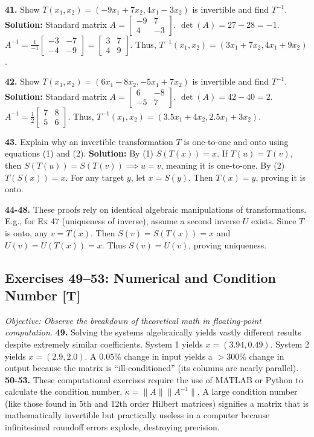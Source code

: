 \documentclass[11pt]{article}
\begin{document}
\textbf{41.} Show $T(x_1, x_2) = (-9x_1 + 7x_2, 4x_1 - 3x_2)$ is invertible and find $T^{-1}$.
\textbf{Solution:} Standard matrix $A = \begin{bmatrix} -9 & 7 \\ 4 & -3 \end{bmatrix}$. 
$\det(A) = 27 - 28 = -1$.
$A^{-1} = \frac{1}{-1} \begin{bmatrix} -3 & -7 \\ -4 & -9 \end{bmatrix} = \begin{bmatrix} 3 & 7 \\ 4 & 9 \end{bmatrix}$. 
Thus, $T^{-1}(x_1, x_2) = (3x_1 + 7x_2, 4x_1 + 9x_2)$.

\textbf{42.} Show $T(x_1, x_2) = (6x_1 - 8x_2, -5x_1 + 7x_2)$ is invertible and find $T^{-1}$.
\textbf{Solution:} Standard matrix $A = \begin{bmatrix} 6 & -8 \\ -5 & 7 \end{bmatrix}$. 
$\det(A) = 42 - 40 = 2$.
$A^{-1} = \frac{1}{2} \begin{bmatrix} 7 & 8 \\ 5 & 6 \end{bmatrix}$. 
Thus, $T^{-1}(x_1, x_2) = (3.5x_1 + 4x_2, 2.5x_1 + 3x_2)$.

\textbf{43.} Explain why an invertible transformation $T$ is one-to-one and onto using equations (1) and (2).
\textbf{Solution:} By (1) $S(T(x)) = x$. If $T(u) = T(v)$, then $S(T(u)) = S(T(v)) \implies u = v$, meaning it is one-to-one. By (2) $T(S(x)) = x$. For any target $y$, let $x = S(y)$. Then $T(x) = y$, proving it is onto.

\textbf{44-48.} These proofs rely on identical algebraic manipulations of transformations. E.g., for Ex 47 (uniqueness of inverse), assume a second inverse $U$ exists. Since $T$ is onto, any $v = T(x)$. Then $S(v) = S(T(x)) = x$ and $U(v) = U(T(x)) = x$. Thus $S(v) = U(v)$, proving uniqueness.

\subsection*{Exercises 49--53: Numerical and Condition Number [T]}
\textit{Objective: Observe the breakdown of theoretical math in floating-point computation.}
\textbf{49.} Solving the systems algebraically yields vastly different results despite extremely similar coefficients. 
System 1 yields $x = (3.94, 0.49)$. System 2 yields $x = (2.9, 2.0)$. A $0.05\%$ change in input yields a $>300\%$ change in output because the matrix is ``ill-conditioned'' (its columns are nearly parallel).
\textbf{50-53.} These computational exercises require the use of MATLAB or Python to calculate the condition number, $\kappa = \|A\| \|A^{-1}\|$. A large condition number (like those found in 5th and 12th order Hilbert matrices) signifies a matrix that is mathematically invertible but practically useless in a computer because infinitesimal roundoff errors explode, destroying precision.
\end{document}
